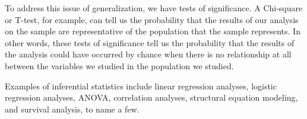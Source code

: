 To address this issue of generalization, we have tests of significance. A Chi-square or T-test, for example, can tell us the probability that the results of our analysis on the sample are representative of the population that the sample represents. In other words, these tests of significance tell us the probability that the results of the analysis could have occurred by chance when there is no relationship at all between the variables we studied in the population we studied.

Examples of inferential statistics include linear regression analyses, logistic regression analyses, ANOVA, correlation analyses, structural equation modeling, and survival analysis, to name a few.

